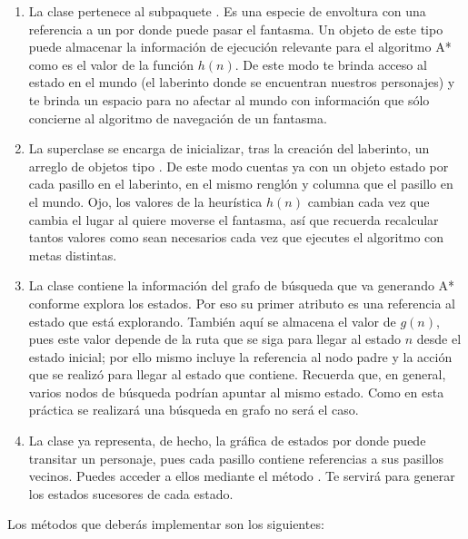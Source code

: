 \begin{enumerate}
 \item La clase  pertenece al subpaquete .  Es una especie de envoltura con una referencia a un  por donde puede pasar el fantasma.  Un objeto de este tipo puede almacenar la información de ejecución relevante para el algoritmo A* como es el valor de la función \(h(n)\).  De este modo te brinda acceso al estado en el mundo (el laberinto donde se encuentran nuestros personajes) y te brinda un espacio para no afectar al mundo con información que sólo concierne al algoritmo de navegación de un fantasma.
 
 \item La superclase  se encarga de inicializar, tras la creación del laberinto, un arreglo de objetos tipo .  De este modo cuentas ya con un objeto estado por cada pasillo en el laberinto, en el mismo renglón y columna que el pasillo en el mundo.  Ojo, los valores de la heurística $h(n)$ cambian cada vez que cambia el lugar al quiere moverse el fantasma, así que recuerda recalcular tantos valores como sean necesarios cada vez que ejecutes el algoritmo con metas distintas.
 
 \item La clase  contiene la información del grafo de búsqueda que va generando A* conforme explora los estados.  Por eso su primer atributo es una referencia al estado que está explorando.  También aquí se almacena el valor de $g(n)$, pues este valor depende de la ruta que se siga para llegar al estado $n$ desde el estado inicial; por ello mismo incluye la referencia al nodo padre y la acción que se realizó para llegar al estado que contiene.  Recuerda que, en general, varios nodos de búsqueda podrían apuntar al mismo estado.  Como en esta práctica se realizará una búsqueda en grafo no será el caso.
 
 \item La clase  ya representa, de hecho, la gráfica de estados por donde puede transitar un personaje, pues cada pasillo contiene referencias a sus pasillos vecinos.  Puedes acceder a ellos mediante el método .  Te servirá para generar los estados sucesores de cada estado.
\end{enumerate}

Los métodos que deberás implementar son los siguientes:

